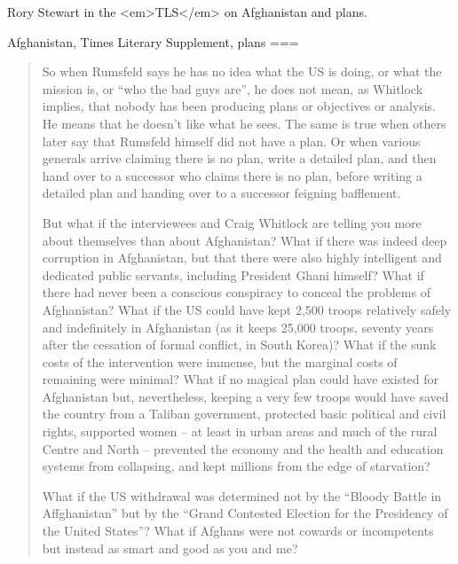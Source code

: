 Rory Stewart in the <em>TLS</em> on Afghanistan and plans.

Afghanistan, Times Literary Supplement, plans
===
\begin{quote}
    So when Rumsfeld says he has no idea what the US is doing, or what the mission is, or “who the bad guys are”, he does not mean, as Whitlock implies, that nobody has been producing plans or objectives or analysis. He means that he doesn’t like what he sees. The same is true when others later say that Rumsfeld himself did not have a plan. Or when various generals arrive claiming there is no plan, write a detailed plan, and then hand over to a successor who claims there is no plan, before writing a detailed plan and handing over to a successor feigning bafflement.

    But what if the interviewees and Craig Whitlock are telling you more about themselves than about Afghanistan? What if there was indeed deep corruption in Afghanistan, but that there were also highly intelligent and dedicated public servants, including President Ghani himself? What if there had never been a conscious conspiracy to conceal the problems of Afghanistan? What if the US could have kept 2,500 troops relatively safely and indefinitely in Afghanistan (as it keeps 25,000 troops, seventy years after the cessation of formal conflict, in South Korea)? What if the sunk costs of the intervention were immense, but the marginal costs of remaining were minimal? What if no magical plan could have existed for Afghanistan but, nevertheless, keeping a very few troops would have saved the country from a Taliban government, protected basic political and civil rights, supported women – at least in urban areas and much of the rural Centre and North – prevented the economy and the health and education systems from collapsing, and kept millions from the edge of starvation?

    What if the US withdrawal was determined not by the “Bloody Battle in Affghanistan” but by the “Grand Contested Election for the Presidency of the United States”? What if Afghans were not cowards or incompetents but instead as smart and good as you and me?
\end{quote}

\nocite{stewart}